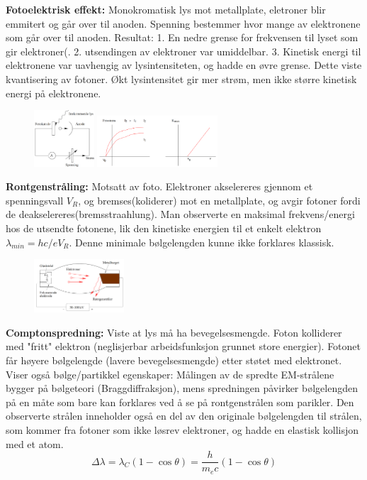 \documentclass[10p,a4paper]{extarticle}
\begin{document}
\begin{multicols}{2}
\textbf{Fotoelektrisk effekt:} Monokromatisk lys mot metallplate, eletroner blir emmitert og går over til anoden. Spenning bestemmer hvor mange av elektronene som går over til anoden. Resultat: 1. En nedre grense for frekvensen til lyset som gir elektroner(. 2. utsendingen av elektroner var umiddelbar. 3. Kinetisk energi til elektronene var uavhengig av lysintensiteten, og hadde en øvre grense. Dette viste kvantisering av fotoner. Økt lysintensitet gir mer strøm, men ikke større kinetisk energi på elektronene.
\begin{figure}[H]
\centering
\includegraphics[width=0.2\textwidth]{foto.png}
\includegraphics[width=0.4\textwidth]{foto2.png}
\end{figure}


\textbf{Rontgenstråling:} Motsatt av foto. Elektroner akselereres gjennom et spenningsvall $V_R$, og bremses(koliderer) mot en metallplate, og avgir fotoner fordi de deakselereres(bremsstraahlung). Man observerte en maksimal frekvens/energi hos de utsendte fotonene, lik den kinetiske energien til et enkelt elektron $\lambda_{min} = hc/eV_R$. Denne minimale bølgelengden kunne ikke forklares klassisk.
\begin{figure}[H]
\centering
\includegraphics[width=0.3\textwidth]{rontgen.png}
\end{figure}


\textbf{Comptonspredning:} Viste at lys må ha bevegelsesmengde. Foton kolliderer med "fritt" elektron (neglisjerbar arbeidsfunksjon grunnet store energier). Fotonet får høyere bølgelengde (lavere bevegelsesmengde) etter støtet med elektronet. Viser også bølge/partikkel egenskaper: Målingen av de spredte EM-strålene bygger på bølgeteori (Braggdiffraksjon), mens spredningen påvirker bølgelengden på en måte som bare kan forklares ved å se på rontgenstrålen som parikler. Den observerte strålen inneholder også en del av den originale bølgelengden til strålen, som kommer fra fotoner som ikke løsrev elektroner, og hadde en elastisk kollisjon med et atom.
\[ \Delta \lambda = \lambda_C (1-\cos\theta) = \frac{h}{m_ec}(1-\cos\theta) \]


\end{multicols}
\end{document}

